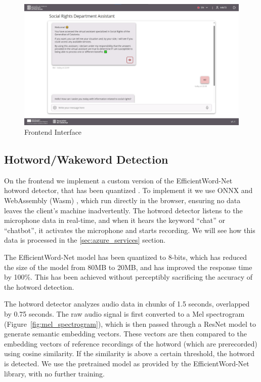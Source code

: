 \documentclass[a4paper,12pt,twoside]{ThesisStyle}
\begin{document}
\begin{figure}[htb]
  \centering
  \includegraphics[width=1\textwidth]{imatges/UI Design.png}
  \caption{Frontend Interface}
  \label{fig:frontend}
\end{figure}

\subsection{Hotword/Wakeword Detection}
\label{subsec:hotword_detection}

On the frontend we implement a custom version of the EfficientWord-Net \cite{Chidhambararajan2022EfficientWordNet} hotword detector, that has been quantized \cite{Zhang2023PostTrainingQuantizationNeuralNetworks}. To implement it we use ONNX \cite{onnx} and WebAssembly (Wasm) \cite{wasm}, which run directly in the browser, ensuring no data leaves the client's machine inadvertently. The hotword detector listens to the microphone data in real-time, and when it hears the keyword ``chat'' or ``chatbot'', it activates the microphone and starts recording. We will see how this data is processed in the \ref{sec:azure_services} section.

The EfficientWord-Net model has been quantized to 8-bits, which has reduced the size of the model from 80MB to 20MB, and has improved the response time by 100\%. This has been achieved without perceptibly sacrificing the accuracy of the hotword detection.

The hotword detector analyzes audio data in chunks of 1.5 seconds, overlapped by 0.75 seconds. The raw audio signal is first converted to a Mel spectrogram (Figure~\ref{fig:mel_spectrogram}), which is then passed through a ResNet \cite{He2015DeepResidualLearningImage} model to generate semantic embedding vectors. These vectors are then compared to the embedding vectors of reference recordings of the hotword (which are prerecorded) using cosine similarity. If the similarity is above a certain threshold, the hotword is detected.
We use the pretrained model as provided by the EfficientWord-Net library, with no further training.
\end{document}
